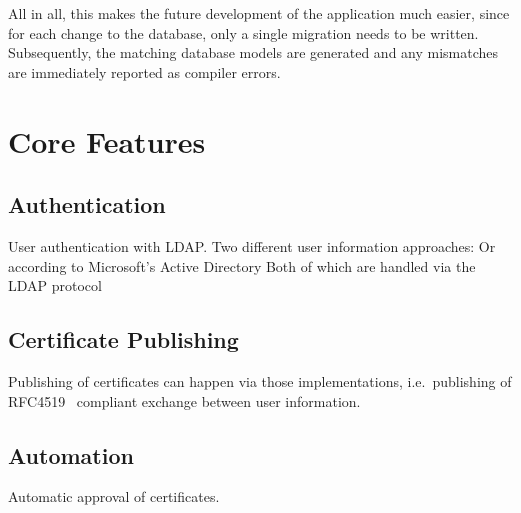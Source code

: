 All in all, this makes the future development of the application much easier, since for each change to the database,
only a single migration needs to be written.
Subsequently, the matching database models are generated and any mismatches are immediately reported as compiler errors.

\section{Core Features}\label{sec:coreFeatures}


\subsection*{Authentication}
User authentication with LDAP. %
Two different user information approaches:
Or according to Microsoft's Active Directory
Both of which are handled via the LDAP protocol %

%

\subsection*{Certificate Publishing}
Publishing of certificates can happen via those implementations, i.e.\ publishing of RFC4519~\cite{RFC4519} compliant
exchange between user information.

\subsection*{Automation}
Automatic approval of certificates.
